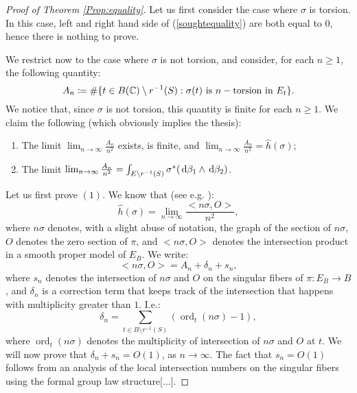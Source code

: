 \documentclass[a4paper,12pt]{article}
\DeclareMathOperator{\ord}{ord}
\begin{document}
\begin{proof}[Proof of Theorem \ref{Prop:equality}]
	Let us first consider the case where $\sigma$ is torsion. In this case, left and right hand side of (\ref{soughtequality}) are both equal to $0$, hence there is nothing to prove. 
	
	We restrict now to the case where $\sigma$ is not torsion, and consider, for each $n \geq 1$, the following quantity:
	\begin{equation}\label{targetorsion}
		A_n \coloneqq \# \{t \in B(\mathbb C)\setminus r^{-1}(S): \sigma(t) \text{ is }n-\text{torsion in } E_t\}.
	\end{equation}
	We notice that, since $\sigma$ is not torsion, this quantity is finite for each $n \geq 1$.
	We claim the following (which obviously implies the thesis):
	\begin{enumerate}
		\item The limit $\lim_{n \to \infty}\frac{A_n}{n^2}$ exists, is finite, and $\lim_{n \to \infty}\frac{A_n}{n^2}=\hat{h}(\sigma)$;
		\item The limit $\lim_{n \to \infty}\frac{A_n}{n^2}=\int_{E \setminus r^{-1}(S)} \sigma^*(\,\mathrm d \beta_1 \wedge \,\mathrm d \beta_2)$.
	\end{enumerate}
	Let us first prove $(1)$. We know that (see e.g. \cite[Sections 2,3]{SerreMW}):
	\[
	\hat{h}(\sigma) =\lim_{n \to \infty} \frac{<n \sigma, O>}{n^2},
	\] 
	where $n\sigma$ denotes, with a slight abuse of notation, the graph of the section of $n \sigma$, $O$ denotes the zero section of $\pi$, and $<n \sigma, O>$ denotes the intersection product in a smooth proper model of $E_B$. We write:
	\[
	<n \sigma, O>=A_n+\delta_n+s_n,
	\]
	where $s_n$ denotes the intersection of $n \sigma$ and $O$ on the singular fibers of $\pi:E_B \rightarrow B$, and $\delta_n$ is a correction term that keeps track of the intersection that happens with multiplicity greater than $1$. I.e.:
	\[
	\delta_n=\sum_{t \in B\setminus r^{-1}(S)} (\ord_t(n\sigma)-1),
	\]
	where $\ord_t(n\sigma)$ denotes the multiplicity of intersection of $n\sigma$ and $O$ at $t$. 
	We will now prove that $\delta_n+s_n=O(1)$, as $n \to \infty$. The fact that $s_n=O(1)$ follows from an analysis of the local intersection numbers on the singular fibers using the formal group law structure[...].
	

\end{proof}
\end{document}
